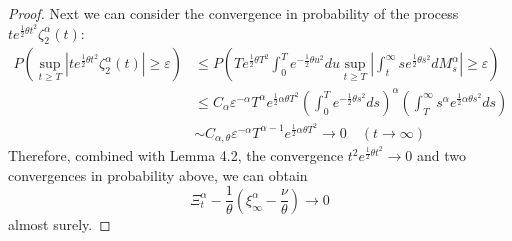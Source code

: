 \documentclass[11pt]{amsart}
\theoremstyle{plain}
\numberwithin{equation}{section}
\begin{document}
\begin{proof}
Next we can consider the convergence in probability of the process $te^{\frac{1}{2}\theta t^2}\zeta_2^\alpha(t)$:
\begin{equation*}
\begin{aligned}
P\left(\sup_{t\geq T} \left|te^{\frac{1}{2}\theta t^2}\zeta_2^\alpha(t)\right|\geq \varepsilon \right)&\leq P\left(Te^{\frac{1}{2}\theta T^2}\int_0^T e^{-\frac{1}{2}\theta u^2}du\sup_{t\geq T} \left|\int_t^\infty se^{\frac{1}{2}\theta s^2 }dM_s^\alpha\right|\geq \varepsilon\right)\\
& \leq C_\alpha \varepsilon^{-\alpha}T^\alpha e^{\frac{1}{2}\alpha \theta T^2}\left(\int_0^T e^{-\frac{1}{2}\theta s^2}ds\right)^\alpha \left(\int_T^\infty s^\alpha e^{\frac{1}{2}\alpha \theta s^2}ds \right)\\
& \sim C_{\alpha,\theta}\varepsilon^{-\alpha} T^{\alpha-1}e^{\frac{1}{2}\alpha \theta T^2}\longrightarrow 0\quad (t\rightarrow\infty)
\end{aligned}
\end{equation*}
Therefore, combined with Lemma 4.2, the convergence $t^2e^{\frac{1}{2}\theta t^2}\rightarrow0$ and two convergences in probability above, we can obtain
\begin{equation}
\Xi_t^\alpha-\frac{1}{\theta}\left(\xi_\infty^\alpha-\frac{\nu}{\theta}\right)\longrightarrow 0
\end{equation}
almost surely.


\end{proof}
\end{document}
